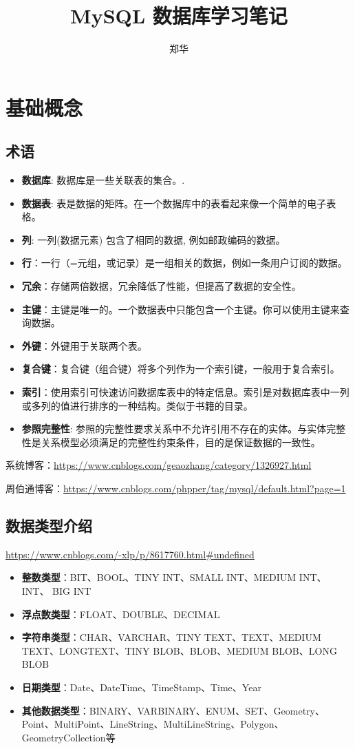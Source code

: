 \documentclass[UTF8,a4paper,12pt]{ctexbook}
\author{\kaishu 郑华}
\title{\heiti MySQL 数据库学习笔记}
\begin{document}
 	\maketitle
 \chapter{基础概念}
	 \section{术语}
		 \begin{itemize}
		 	\item  \textbf{数据库}: 数据库是一些关联表的集合。.
		 	\item  \textbf{数据表}: 表是数据的矩阵。在一个数据库中的表看起来像一个简单的电子表格。
		 	\item  \textbf{列}: 一列(数据元素) 包含了相同的数据, 例如邮政编码的数据。
		 	\item  \textbf{行}：一行（=元组，或记录）是一组相关的数据，例如一条用户订阅的数据。
		 	\item  \textbf{冗余}：存储两倍数据，冗余降低了性能，但提高了数据的安全性。
		 	\item  \textbf{主键}：主键是唯一的。一个数据表中只能包含一个主键。你可以使用主键来查询数据。
		 	\item  \textbf{外键}：外键用于关联两个表。
		 	\item  \textbf{复合键}：复合键（组合键）将多个列作为一个索引键，一般用于复合索引。
		 	\item  \textbf{索引}：使用索引可快速访问数据库表中的特定信息。索引是对数据库表中一列或多列的值进行排序的一种结构。类似于书籍的目录。
		 	\item  \textbf{参照完整性}: 参照的完整性要求关系中不允许引用不存在的实体。与实体完整性是关系模型必须满足的完整性约束条件，目的是保证数据的一致性。
		 \end{itemize}
		
		
		系统博客：\url{https://www.cnblogs.com/geaozhang/category/1326927.html}
		
		周伯通博客：\url{https://www.cnblogs.com/phpper/tag/mysql/default.html?page=1}
	
	\section{数据类型介绍}
		\url{https://www.cnblogs.com/-xlp/p/8617760.html#undefined}
		
		\begin{itemize}
			\item \textbf{整数类型}：BIT、BOOL、TINY INT、SMALL INT、MEDIUM INT、 INT、 BIG INT
			\item \textbf{浮点数类型}：FLOAT、DOUBLE、DECIMAL
			\item \textbf{字符串类型}：CHAR、VARCHAR、TINY TEXT、TEXT、MEDIUM TEXT、LONGTEXT、TINY BLOB、BLOB、MEDIUM BLOB、LONG BLOB
			\item \textbf{日期类型}：Date、DateTime、TimeStamp、Time、Year
			\item \textbf{其他数据类型}：BINARY、VARBINARY、ENUM、SET、Geometry、Point、MultiPoint、LineString、MultiLineString、Polygon、GeometryCollection等
		\end{itemize}
	
\end{document}
